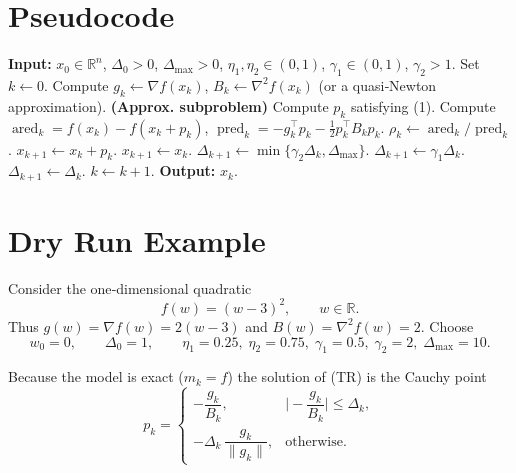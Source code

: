 \documentclass{article}
\begin{document}
\section*{Pseudocode}
\begin{algorithm}[H]
\caption{Trust Region Method with Approximate Subproblem (TR‑AP)}\label{alg:TRAP}
\begin{algorithmic}[1]
\State \textbf{Input:} $x_{0}\in\mathbb{R}^{n}$, $\Delta_{0}>0$, 
$\Delta_{\max}>0$, $\eta_{1},\eta_{2}\in(0,1)$,
$\gamma_{1}\in(0,1)$, $\gamma_{2}>1$.
\State Set $k\gets0$.
    \State Compute $g_{k}\gets\nabla f(x_{k})$, $B_{k}\gets\nabla^{2}f(x_{k})$ (or a
    quasi‑Newton approximation).
    \State \textbf{(Approx. subproblem)} Compute $p_{k}$ satisfying (1).
    \State Compute $\operatorname{ared}_{k}=f(x_{k})-f(x_{k}+p_{k})$,
    $\operatorname{pred}_{k}= -g_{k}^{\top}p_{k}-\tfrac12 p_{k}^{\top}B_{k}p_{k}$.
    \State $\rho_{k}\gets\operatorname{ared}_{k}/\operatorname{pred}_{k}$.
        \State $x_{k+1}\gets x_{k}+p_{k}$.
    \Else
        \State $x_{k+1}\gets x_{k}$.
    \EndIf
        \State $\Delta_{k+1}\gets \min\{\gamma_{2}\Delta_{k},\Delta_{\max}\}$.
        \State $\Delta_{k+1}\gets \gamma_{1}\Delta_{k}$.
    \Else
        \State $\Delta_{k+1}\gets \Delta_{k}$.
    \EndIf
    \State $k\gets k+1$.
\EndWhile
\State \textbf{Output:} $x_{k}$.
\end{algorithmic}
\end{algorithm}

\section*{Dry Run Example}
Consider the one‑dimensional quadratic
\[
f(w)=(w-3)^{2},\qquad w\in\mathbb{R}.
\]
Thus $g(w)=\nabla f(w)=2(w-3)$ and $B(w)=\nabla^{2}f(w)=2$.
Choose
\[
w_{0}=0,\qquad \Delta_{0}=1,\qquad 
\eta_{1}=0.25,\;\eta_{2}=0.75,\;
\gamma_{1}=0.5,\;\gamma_{2}=2,\;
\Delta_{\max}=10 .
\]

Because the model is exact ($m_{k}=f$) the solution of (TR) is the Cauchy point
\[
p_{k}=
\begin{cases}
-\dfrac{g_{k}}{B_{k}}, &\bigl|-\dfrac{g_{k}}{B_{k}}\bigr|\le\Delta_{k},\\[2mm]
-\Delta_{k}\,\dfrac{g_{k}}{\|g_{k}\|}, &\text{otherwise}.
\end{cases}
\tag{5}
\]
\end{document}
